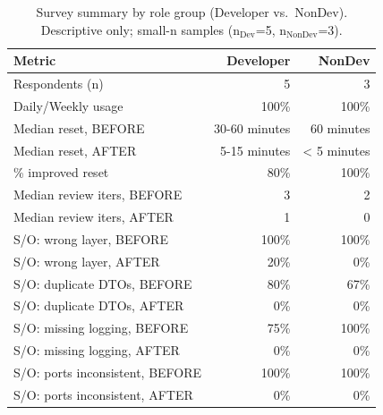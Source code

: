 \begin{table}[t]
\centering
\small
\caption{Survey summary by role group (Developer vs.\ NonDev). Descriptive only; small-n samples (n$_\text{Dev}$=5, n$_\text{NonDev}$=3).}
\label{tab:survey-by-role-v1}
\begin{tabular}{lrr}
\toprule
Metric & Developer & NonDev \\
\midrule
Respondents (n) & 5 & 3 \\
Daily/Weekly usage & 100\% & 100\% \\
Median reset, BEFORE & 30-60 minutes & 60 minutes \\
Median reset, AFTER & 5-15 minutes & < 5 minutes \\
\% improved reset & 80\% & 100\% \\
Median review iters, BEFORE & 3 & 2 \\
Median review iters, AFTER & 1 & 0 \\
S/O: wrong layer, BEFORE & 100\% & 100\% \\
S/O: wrong layer, AFTER & 20\% & 0\% \\
S/O: duplicate DTOs, BEFORE & 80\% & 67\% \\
S/O: duplicate DTOs, AFTER & 0\% & 0\% \\
S/O: missing logging, BEFORE & 75\% & 100\% \\
S/O: missing logging, AFTER & 0\% & 0\% \\
S/O: ports inconsistent, BEFORE & 100\% & 100\% \\
S/O: ports inconsistent, AFTER & 0\% & 0\% \\
\bottomrule
\end{tabular}
\end{table}
